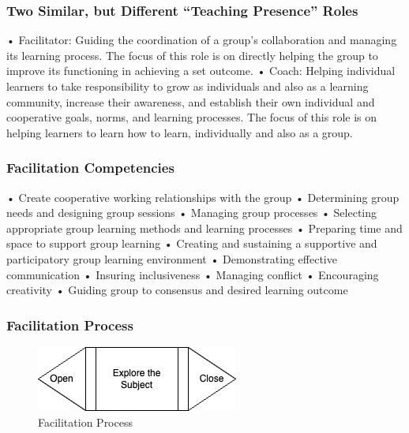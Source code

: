 \documentclass[
]{book}
\begin{document}
\hypertarget{two-similar-but-different-teaching-presence-roles}{%
\subsubsection*{Two Similar, but Different ``Teaching Presence'' Roles}\label{two-similar-but-different-teaching-presence-roles}}

• Facilitator: Guiding the coordination of a group's collaboration and managing its learning process. The focus of this role is on directly helping the group to improve its functioning in achieving a set outcome.
• Coach: Helping individual learners to take responsibility to grow as individuals and also as a learning community, increase their awareness, and establish their own individual and cooperative goals, norms, and learning processes. The focus of this role is on helping learners to learn how to learn, individually and also as a group.

\hypertarget{facilitation-competencies}{%
\subsubsection*{Facilitation Competencies}\label{facilitation-competencies}}

• Create cooperative working relationships with the group
• Determining group needs and designing group sessions
• Managing group processes
• Selecting appropriate group learning methods and learning processes
• Preparing time and space to support group learning
• Creating and sustaining a supportive and participatory group learning environment
• Demonstrating effective communication
• Insuring inclusiveness
• Managing conflict
• Encouraging creativity
• Guiding group to consensus and desired learning outcome

\hypertarget{facilitation-process}{%
\subsubsection*{Facilitation Process}\label{facilitation-process}}

\begin{figure}
\centering
\includegraphics{assets/presentations/facilitation/fac-process.drawio.png}
\caption{Facilitation Process}
\end{figure}
\end{document}
